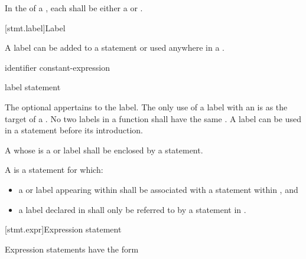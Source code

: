 \pnum
In the  of a , each
 shall be either a 
or .

[stmt.label]{Label}%

\pnum
{}%
%
A label can be added to a statement or
used anywhere in a .

\begin{bnf}
\br
     identifier \terminal{:}\br
      constant-expression \terminal{:}\br
      \terminal{:}
\end{bnf}

\begin{bnf}
\br
    label statement
\end{bnf}

The optional  appertains to the label.
%
The only use of a label with an  is
as the target of a .
%
No two labels in a function shall have the same .
A label can be used in a  statement
before its introduction.

\pnum
{}%
%
%
A 
whose  is a  or  label
shall be enclosed by a  statement.

\pnum
A  is a statement  for which:
\begin{itemize}
\item
  a  or  label appearing within  shall
  be associated with a  statement within
  , and
\item
  a label declared in  shall only be referred to by a
  statement in .
\end{itemize}


[stmt.expr]{Expression statement}%

\pnum
Expression statements have the form
\begin{bnf}
\br
     \terminal{;}
\end{bnf}

